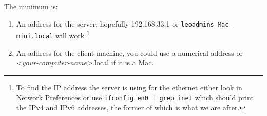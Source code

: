 \documentclass[11pt]{article}
\begin{document}
\begin{enumerate} [\bf 1.]
\begin{enumerate} [\bf i.]
{			  The minimum is: }
		\begin{enumerate} [\bf a.]
			\item{An address for the server; hopefully 192.168.33.1 or \texttt{leoadmins-Mac-mini.local} will work
			\footnote{ To find the IP address the server is using for the ethernet either look in Network Preferences or use \verb+ifconfig en0 | grep inet+
			which should print the IPv4 and IPv6 addresses, the former of which is what we are after.}}
			\item{An address for the client machine, you could use a numerical address or \textit{<your-computer-name>}.local if it is a Mac.}
		\end{enumerate}
	\end{enumerate}

\end{enumerate}
\end{document}

